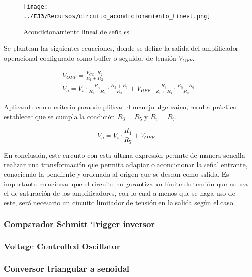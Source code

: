 \begin{figure}[H]
    \centering
    \texttt{[image: ../EJ3/Recursos/circuito\_acondicionamiento\_lineal.png]}
    \caption{Acondicionamiento lineal de se\~nales}
    \label{fig:circuito_acondicionamiento_lineal}
\end{figure}

Se plantean las siguientes ecuaciones, donde se define la salida del amplificador operacional configurado como buffer o seguidor de tensi\'on $V_{OFF}$.

\begin{align*}
    & V_{OFF} = \frac{V_{CC} \cdot R_2}{R_1 + R_2} \\
    & V_o = V_i \cdot \frac{R_4}{R_3 + R_4} \cdot \frac{R_5 + R_6}{R_5}
    + V_{OFF} \cdot \frac{R_3}{R_3 + R_4} \cdot \frac{R_5 + R_6}{R_5}
\end{align*}

Aplicando como criterio para simplificar el manejo algebraico, resulta pr\'actico establecer que se cumpla la condici\'on
$R_3 = R_5$ y $R_4 = R_6$.

\begin{equation}
    V_o = V_i \cdot \frac{R_4}{R_5} + V_{OFF}
\end{equation}

En conclusi\'on, este circuito con esta \'ultima expresi\'on permite de manera sencilla realizar una transformaci\'on que permita adaptar o acondicionar
la se\~nal entrante, conociendo la pendiente y ordenada al origen que se desean como salida. Es importante mencionar que el circuito no garantiza un l\'imite de tensi\'on 
que no sea el de saturaci\'on de los amplificadores, con lo cual a menos que se haga uso de este, ser\'a necesario un circuito limitador de tensi\'on en la salida seg\'un el caso.

\subsubsection{Comparador Schmitt Trigger inversor}

\subsubsection{Voltage Controlled Oscillator}

\subsubsection{Conversor triangular a senoidal}

